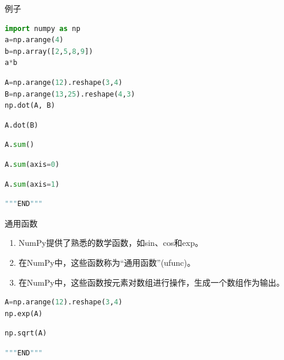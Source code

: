 \documentclass[ignorenonframetext,11pt,xcolor=dvipsnames,hyperref={colorlinks,allcolors=.,urlcolor=blue, citecolor=violet, bookmarksdepth=4},aspectratio=1610]{beamer}
\providecommand{\tightlist}{%
  \setlength{\itemsep}{0pt}\setlength{\parskip}{0pt}}
\begin{document}
\begin{frame}[fragile]{例子}
\protect\hypertarget{section-8}{}

\begin{lstlisting}[language=Python]
import numpy as np
a=np.arange(4)
b=np.array([2,5,8,9])
a*b
\end{lstlisting}

\begin{lstlisting}[language=Python]
A=np.arange(12).reshape(3,4)
B=np.arange(13,25).reshape(4,3)
np.dot(A, B)
\end{lstlisting}

\begin{lstlisting}[language=Python]
A.dot(B)
\end{lstlisting}

\begin{lstlisting}[language=Python]
A.sum()
\end{lstlisting}

\begin{lstlisting}[language=Python]
A.sum(axis=0)
\end{lstlisting}

\begin{lstlisting}[language=Python]
A.sum(axis=1)
\end{lstlisting}

\begin{lstlisting}[language=Python]
"""END"""
\end{lstlisting}

\end{frame}

\begin{frame}[fragile]{通用函数}
\protect\hypertarget{section-9}{}

\begin{enumerate}
\tightlist
\item
  NumPy提供了熟悉的数学函数，如sin、cos和exp。
\item
  在NumPy中，这些函数称为``通用函数''(ufunc)。
\item
  在NumPy中，这些函数按元素对数组进行操作，生成一个数组作为输出。
\end{enumerate}

\begin{lstlisting}[language=Python]
A=np.arange(12).reshape(3,4)
np.exp(A)
\end{lstlisting}

\begin{lstlisting}[language=Python]
np.sqrt(A)
\end{lstlisting}

\begin{lstlisting}[language=Python]
"""END"""
\end{lstlisting}

\end{frame}
\end{document}
